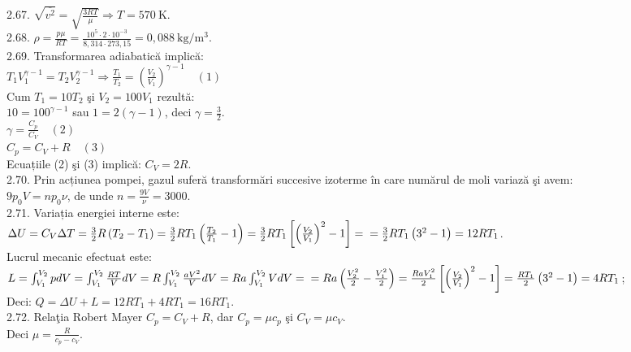 2.67. $\sqrt{\overline{v^{2}}}=\sqrt{\frac{3 R T}{\mu}} \Rightarrow T=570 \mathrm{~K}$.\\

2.68. $\rho=\frac{p \mu}{R T}=\frac{10^{5} \cdot 2 \cdot 10^{-3}}{8,314 \cdot 273,15}=0,088 \mathrm{~kg} / \mathrm{m}^{3}$.\\

2.69. Transformarea adiabatică implică:\\ $T_{1} V_{1}^{\gamma-1}=T_{2} V_{2}^{\gamma-1} \Rightarrow \frac{T_{1}}{T_{2}}=\left(\frac{V_{2}}{V_{1}}\right)^{\gamma-1} \quad (1)$\\ Cum $T_{1}=10 T_{2}$ şi $V_{2}=100 V_{1}$ rezultă:\\ $10=100^{\gamma-1}$ sau $1=2(\gamma-1)$, deci $\gamma=\frac{3}{2}$.\\ $\gamma=\frac{C_{p}}{C_{V}} \quad (2)$\\ $C_{p}=C_{V}+R \quad (3)$\\ Ecuațiile (2) şi (3) implică: $C_{V}=2 R$.\\

2.70. Prin acțiunea pompei, gazul suferă transformări succesive izoterme în care numărul de moli variază şi avem:\\ $9 p_{0} V=n p_{0} \nu$, de unde $n=\frac{9 V}{\nu}=3000$.\\

2.71. Variația energiei interne este:\\ $\Delta U=C_{V} \Delta T=\frac{3}{2} R\left(T_{2}-T_{1}\right)=\frac{3}{2} R T_{1}\left(\frac{T_{2}}{T_{1}}-1\right)=\frac{3}{2} R T_{1}\left[\left(\frac{V_{2}}{V_{1}}\right)^{2}-1\right]= \\ =\frac{3}{2} R T_{1}\left(3^{2}-1\right)=12 R T_{1}$.\\ Lucrul mecanic efectuat este:\\ $L=\int_{V_{1}}^{V_{2}} p d V=\int_{V_{1}}^{V_{2}} \frac{R T}{V} d V=R \int_{V_{1}}^{V_{2}} \frac{a V^{2}}{V} d V=R a \int_{V_{1}}^{V_{2}} V d V= \\ =R a\left(\frac{V_{2}^{2}}{2}-\frac{V_{1}^{2}}{2}\right)=\frac{R a V_{1}^{2}}{2}\left[\left(\frac{V_{2}}{V_{1}}\right)^{2}-1\right]=\frac{R T_{1}}{2}\left(3^{2}-1\right)=4 R T_{1}$;\\ Deci: $Q=\Delta U+L=12 R T_{1}+4 R T_{1}=16 R T_{1}$.\\

2.72. Relaţia Robert Mayer $C_{p}=C_{V}+R$, dar $C_{p}=\mu c_{p}$ şi $C_{V}=\mu c_{V}$.\\ Deci $\mu=\frac{R}{c_{p}-c_{V}}$.\\

